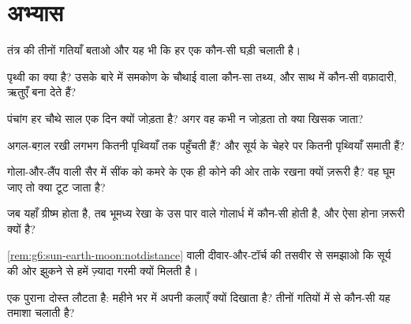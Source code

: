 \section{अभ्यास}

\begin{exercise}[$\star$]\label{exo:g6:sun-earth-moon:1}
तंत्र की तीनों गतियाँ बताओ और यह भी कि हर एक कौन-सी घड़ी चलाती है।
\end{exercise}

\begin{exercise}[$\star$]\label{exo:g6:sun-earth-moon:2}
पृथ्वी का  क्या है? उसके बारे में समकोण के चौथाई वाला कौन-सा तथ्य,
और साथ में कौन-सी वफ़ादारी, ऋतुएँ बना देते हैं?
\end{exercise}

\begin{exercise}[$\star$]\label{exo:g6:sun-earth-moon:3}
पंचांग हर चौथे साल एक दिन क्यों जोड़ता है? अगर वह कभी न जोड़ता तो क्या
खिसक जाता?
\end{exercise}

\begin{exercise}[$\star$]\label{exo:g6:sun-earth-moon:4}
अगल-बग़ल रखी लगभग कितनी पृथ्वियाँ  तक पहुँचती हैं? और सूर्य के
चेहरे पर कितनी पृथ्वियाँ समाती हैं?
\end{exercise}

\begin{exercise}[$\star$]\label{exo:g6:sun-earth-moon:5}
गोला-और-लैंप वाली सैर में सींक को कमरे के एक ही कोने की ओर ताके रखना
क्यों ज़रूरी है? वह घूम जाए तो क्या टूट जाता है?
\end{exercise}

\begin{exercise}[$\star$]\label{exo:g6:sun-earth-moon:6}
जब यहाँ ग्रीष्म होता है, तब भूमध्य रेखा के उस पार वाले गोलार्ध में
कौन-सी  होती है, और ऐसा होना ज़रूरी क्यों है?
\end{exercise}

\begin{exercise}[$\star$]\label{exo:g6:sun-earth-moon:7}
\cref{rem:g6:sun-earth-moon:notdistance} वाली दीवार-और-टॉर्च की
तसवीर से समझाओ कि सूर्य की ओर झुकने से हमें ज़्यादा गरमी क्यों मिलती
है।
\end{exercise}

\begin{exercise}[$\star$]\label{exo:g6:sun-earth-moon:8}
एक पुराना दोस्त लौटता है: महीने भर में  अपनी कलाएँ क्यों
दिखाता है? तीनों गतियों में से कौन-सी यह तमाशा चलाती है?
\end{exercise}

